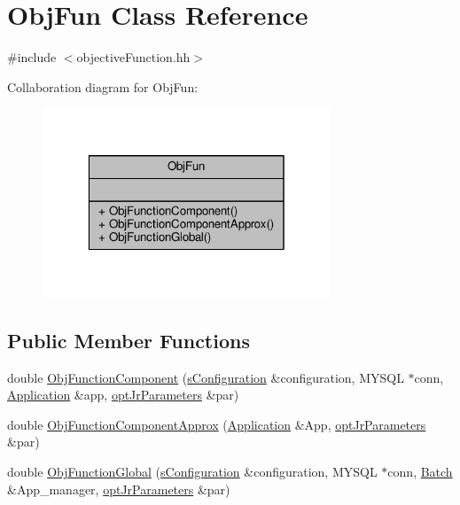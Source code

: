 \hypertarget{classObjFun}{\section{Obj\-Fun Class Reference}
\label{classObjFun}
}


{\ttfamily \#include $<$objective\-Function.\-hh$>$}



Collaboration diagram for Obj\-Fun\-:\nopagebreak
\begin{figure}[H]
\begin{center}
\leavevmode
\includegraphics[width=244pt]{classObjFun__coll__graph}
\end{center}
\end{figure}
\subsection*{Public Member Functions}
\begin{DoxyCompactItemize}
\item 
double \hyperlink{classObjFun_a7c9ecaa07ca776eb64f6e73f84513bc7}{Obj\-Function\-Component} (\hyperlink{readConfigurationFile_8hh_ab8f35b1da3261263c5e9c0e7c8921f5c}{s\-Configuration} \&configuration, M\-Y\-S\-Q\-L $\ast$conn, \hyperlink{classApplication}{Application} \&app, \hyperlink{classoptJrParameters}{opt\-Jr\-Parameters} \&par)
\item 
double \hyperlink{classObjFun_abb89a994d34b44ec4cb6e0e2562c0107}{Obj\-Function\-Component\-Approx} (\hyperlink{classApplication}{Application} \&App, \hyperlink{classoptJrParameters}{opt\-Jr\-Parameters} \&par)
\item 
double \hyperlink{classObjFun_ab36af3a1d85dbcaa79dc9b582b00928b}{Obj\-Function\-Global} (\hyperlink{readConfigurationFile_8hh_ab8f35b1da3261263c5e9c0e7c8921f5c}{s\-Configuration} \&configuration, M\-Y\-S\-Q\-L $\ast$conn, \hyperlink{classBatch}{Batch} \&App\-\_\-manager, \hyperlink{classoptJrParameters}{opt\-Jr\-Parameters} \&par)
\end{DoxyCompactItemize}


